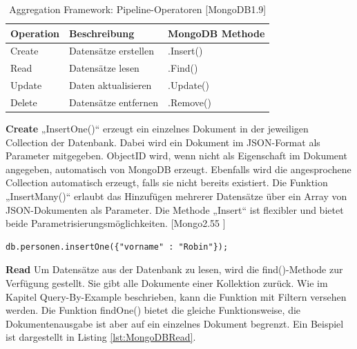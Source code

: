 \begin{table}[htb]
\begin{center}
    \begin{tabular}{| l | p{8cm} | l |}
    \hline
    \textbf{Operation} & \textbf{Beschreibung} & \textbf{MongoDB Methode} \\
    
    \hline
    Create & Datensätze erstellen & .Insert() \\
    
    \hline
	Read & Datensätze lesen & .Find() \\
	
    \hline    
    Update & Daten aktualisieren & .Update() \\ 
   
    \hline    
    Delete & Datensätze entfernen & .Remove()  \\ 
    
    \hline
    \end{tabular}
\end{center}
\caption{Aggregation Framework: Pipeline-Operatoren [MongoDB1.9]}
\end{table}

\textbf{Create}
\newline
„InsertOne()“ erzeugt ein einzelnes Dokument in der jeweiligen Collection der Datenbank. Dabei wird ein Dokument im JSON-Format als Parameter mitgegeben. ObjectID wird, wenn nicht als Eigenschaft im Dokument angegeben, automatisch von MongoDB erzeugt. Ebenfalls wird die angesprochene Collection automatisch erzeugt, falls sie nicht bereits existiert. Die Funktion „InsertMany()“  erlaubt das Hinzufügen mehrerer Datensätze über ein Array von JSON-Dokumenten als Parameter. Die Methode „Insert“ ist flexibler und bietet beide Parametrisierungsmöglichkeiten. [Mongo2.55 ]
\newline
\begin{lstlisting}[caption=MongoDB Create, label=lst:MongoDBCreate]
db.personen.insertOne({"vorname" : "Robin"});
\end{lstlisting}

\textbf{Read}
\newline
Um Datensätze aus der Datenbank zu lesen, wird die find()-Methode zur Verfügung gestellt. Sie gibt alle Dokumente einer Kollektion zurück. Wie im Kapitel Query-By-Example beschrieben, kann die Funktion mit Filtern versehen werden. Die Funktion findOne() bietet die gleiche Funktionsweise, die Dokumentenausgabe ist aber auf ein einzelnes Dokument begrenzt. 
Ein Beispiel ist dargestellt in Listing \ref{lst:MongoDBRead}.
\newline\newline

